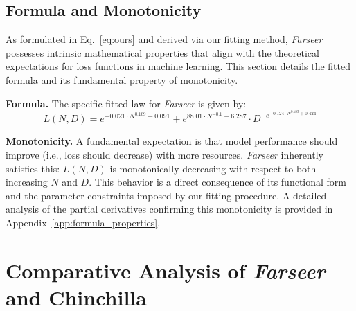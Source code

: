 \documentclass{article}
\begin{document}
\subsection{Formula and Monotonicity}
\label{sec:formula_monotonicity}

As formulated in Eq.~\eqref{eq:ours} and derived via our fitting method, \textit{Farseer} possesses intrinsic mathematical properties that align with the theoretical expectations for loss functions in machine learning. This section details the fitted formula and its fundamental property of monotonicity.

\textbf{Formula.}
The specific fitted law for \textit{Farseer} is given by:
\begin{equation}
\label{eq:farseer_specific_coeffs_simplified}
L(N, D) = e^{-0.021 \cdot N^{0.169} -0.091} + e^{88.01 \cdot N^{-0.1} - 6.287} \cdot D^{-e^{-0.124 \cdot N^{0.123}+0.424}}
\end{equation}

\textbf{Monotonicity.}
A fundamental expectation is that model performance should improve (i.e., loss should decrease) with more resources. \textit{Farseer} inherently satisfies this: $L(N,D)$ is monotonically decreasing with respect to both increasing $N$ and $D$. This behavior is a direct consequence of its functional form and the parameter constraints imposed by our fitting procedure. A detailed analysis of the partial derivatives confirming this monotonicity is provided in Appendix~\ref{app:formula_properties}.



\section{Comparative Analysis of \textit{Farseer} and Chinchilla} \label{sec:chinchilla_comparison}


\end{document}
